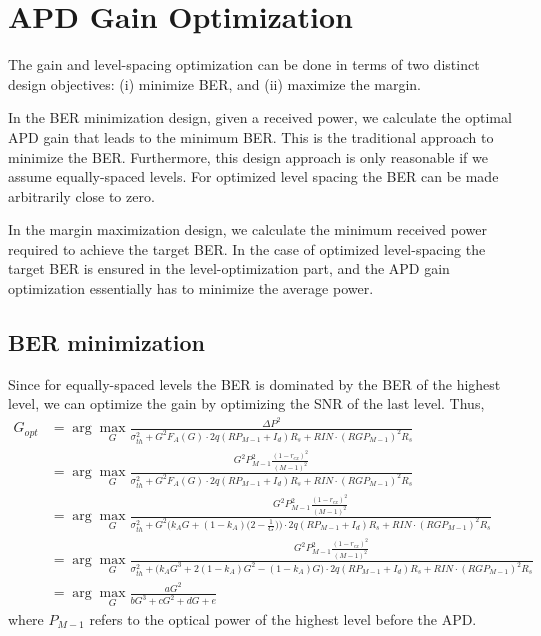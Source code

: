 \documentclass[a4paper]{article}
\begin{document}


\section{APD Gain Optimization}

The gain and level-spacing optimization can be done in terms of two distinct design objectives: (i) minimize BER, and (ii) maximize the margin. 

In the BER minimization design, given a received power, we calculate the optimal APD gain that leads to the minimum BER. This is the traditional approach to minimize the BER. Furthermore, this design approach is only reasonable if we assume equally-spaced levels. For optimized level spacing the BER can be made arbitrarily close to zero.

In the margin maximization design, we calculate the minimum received power required to achieve the target BER. In the case of optimized level-spacing the target BER is ensured in the level-optimization part, and the APD gain optimization essentially has to minimize the average power.

\subsection{BER minimization}
Since for equally-spaced levels the BER is dominated by the BER of the highest level, we can optimize the gain by optimizing the SNR of the last level. Thus,
\begin{align} \label{eq:Gopt-ber} \nonumber
G_{opt} &= \arg\max_{G} \frac{\Delta P^2}{\sigma_{th}^2 + G^2F_A(G)\cdot 2q(RP_{M-1} + I_d)R_s + RIN\cdot (RGP_{M-1})^2R_s} \\ \nonumber
& = \arg\max_{G}\frac{G^2P^2_{M-1}\frac{(1-r_{ex})^2}{(M-1)^2}}{\sigma_{th}^2 + G^2F_A(G)\cdot 2q(RP_{M-1} + I_d)R_s + RIN\cdot (RGP_{M-1})^2R_s} \\ \nonumber
& = \arg\max_{G}\frac{G^2P^2_{M-1}\frac{(1-r_{ex})^2}{(M-1)^2}}{\sigma_{th}^2 + G^2\Big(k_AG + (1-k_A)\Big(2 - \frac{1}{G}\Big)\Big)\cdot 2q(RP_{M-1} + I_d)R_s + RIN\cdot (RGP_{M-1})^2R_s} \\ \nonumber
& = \arg\max_{G}\frac{G^2P^2_{M-1}\frac{(1-r_{ex})^2}{(M-1)^2}}{\sigma_{th}^2 + \Big(k_AG^3 + 2(1-k_A)G^2 - (1-k_A)G\Big)\cdot 2q(RP_{M-1} + I_d)R_s + RIN\cdot (RGP_{M-1})^2R_s} \\
& = \arg\max_{G}\frac{aG^2}{bG^3 + cG^2 + dG + e}
\end{align}
where $P_{M-1}$ refers to the optical power of the highest level before the APD.
\end{document}
